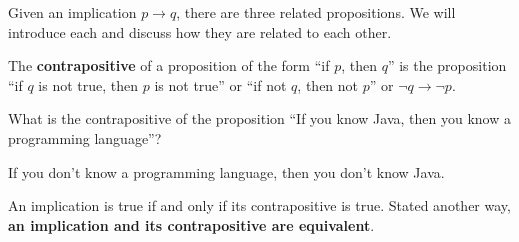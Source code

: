 Given an implication $p\rightarrow q$, 
there are three related propositions. 
We will introduce each and discuss how they
are related to each other.



%


\begin{df}
The {\bf contrapositive} of a proposition of the form ``if $p$, then $q$'' is the proposition  
``if $q$ is not true, then $p$ is not true''  or ``if not $q$, then not $p$''
or $\neg q \rightarrow \neg p$.
\end{df}

\begin{ques}
What is the contrapositive of the proposition ``If you know Java, then you know a programming language''?\\
\answerlinetwo
\begin{answer}
If you don't know a programming language, then you don't know Java.
\end{answer}
\end{ques}

\begin{thm}\label{impConv}
An implication is true if and only if its contrapositive is true.
Stated another way, {\bf an implication and its contrapositive are equivalent}.
\end{thm}


